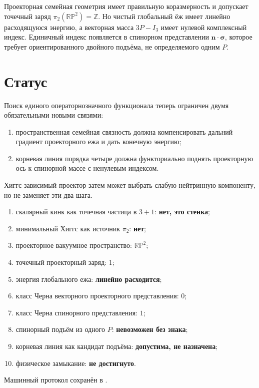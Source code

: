 \begin{theorem}
Проекторная семейная геометрия имеет правильную коразмерность и допускает
точечный заряд $\pi_2(\mathbb{RP}^2)=\mathbb Z$. Но чистый глобальный ёж
имеет линейно расходящуюся энергию, а векторная масса $3P-I_3$ имеет
нулевой комплексный индекс. Единичный индекс появляется в спинорном
представлении $\mathbf n\cdot\boldsymbol\sigma$, которое требует
ориентированного двойного подъёма, не определяемого одним $P$.
\end{theorem}

\section{Статус}

Поиск единого операторнозначного функционала теперь ограничен двумя
обязательными новыми связями:
\begin{enumerate}
 \item пространственная семейная связность должна компенсировать дальний
 градиент проекторного ежа и дать конечную энергию;
 \item корневая линия порядка четыре должна функториально поднять
 проекторную ось к спинорной массе с ненулевым индексом.
\end{enumerate}
Хиггс-зависимый проектор затем может выбрать слабую нейтринную компоненту,
но не заменяет эти два шага.

\begin{protocol}
\begin{enumerate}
 \item скалярный кинк как точечная частица в $3+1$:
 \textbf{нет, это стенка};
 \item минимальный Хиггс как источник $\pi_2$: \textbf{нет};
 \item проекторное вакуумное пространство: \textbf{$\mathbb{RP}^2$};
 \item точечный проекторный заряд: \textbf{$1$};
 \item энергия глобального ежа: \textbf{линейно расходится};
 \item класс Черна векторного проекторного представления:
 \textbf{$0$};
 \item класс Черна спинорного представления: \textbf{$1$};
 \item спинорный подъём из одного $P$: \textbf{невозможен без знака};
 \item корневая линия как кандидат подъёма: \textbf{допустима, не назначена};
 \item физическое замыкание: \textbf{не достигнуто}.
\end{enumerate}
\end{protocol}

Машинный протокол сохранён в
.